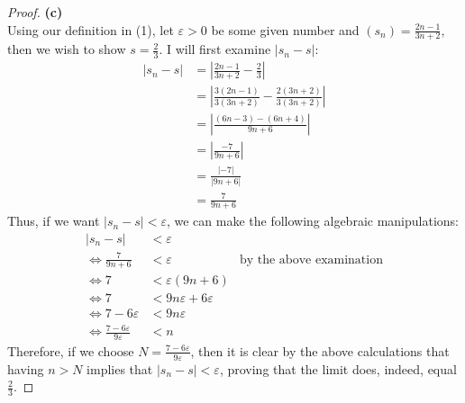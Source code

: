 \documentclass[10pt,a4paper]{article}
\theoremstyle{definition}
\begin{document}
\begin{proof}{\textbf{(c)}}
\\Using our definition in (1), let $\varepsilon > 0$ be some given number and $\displaystyle (s_n) = \frac{2n - 1}{3n + 2}$, then we wish to show $\displaystyle s = \frac{2}{3}$. I will first examine $|s_n - s|$:
\begin{align*}
|s_n - s| &= \left|\frac{2n - 1}{3n + 2} - \frac{2}{3}\right|\\
&= \left| \frac{3(2n - 1)}{3(3n + 2)} - \frac{2(3n + 2)}{3(3n + 2)} \right|\\
&= \left|\frac{(6n - 3) - (6n + 4)}{9n + 6}\right|\\
&= \left| \frac{-7}{9n + 6} \right|\\
&= \frac{|-7|}{|9n + 6|}\\
&= \frac{7}{9n + 6}
\end{align*}
Thus, if we want $|s_n - s| < \varepsilon$, we can make the following algebraic manipulations:
\begin{align*}
|s_n - s| &< \varepsilon\\
\iff \frac{7}{9n + 6} &< \varepsilon &\text{by the above examination}\\
\iff 7 &< \varepsilon(9n + 6)\\
\iff 7 &< 9n\varepsilon + 6\varepsilon\\
\iff 7 - 6\varepsilon &< 9n\varepsilon\\
\iff \frac{7 - 6\varepsilon}{9\varepsilon} &< n
\end{align*}
Therefore, if we choose $\displaystyle N = \frac{7 - 6\varepsilon}{9\varepsilon}$, then it is clear by the above calculations that having $n > N$ implies that $|s_n - s| < \varepsilon$, proving that the limit does, indeed, equal $\displaystyle \frac{2}{3}$.
\end{proof}
\end{document}
